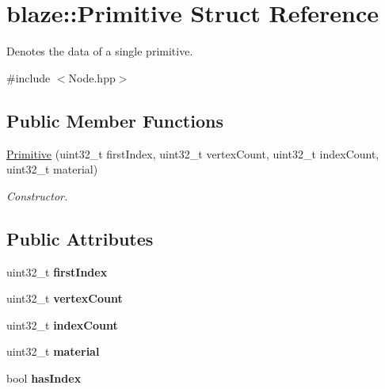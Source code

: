 \hypertarget{structblaze_1_1Primitive}{}\section{blaze\+:\+:Primitive Struct Reference}
\label{structblaze_1_1Primitive}


Denotes the data of a single primitive.  




{\ttfamily \#include $<$Node.\+hpp$>$}

\subsection*{Public Member Functions}
\begin{DoxyCompactItemize}
\item 
\mbox{\label{structblaze_1_1Primitive_ad0b907c09e78d280f97510cfd36b684a}} 
\hyperlink{structblaze_1_1Primitive_ad0b907c09e78d280f97510cfd36b684a}{Primitive} (uint32\+\_\+t first\+Index, uint32\+\_\+t vertex\+Count, uint32\+\_\+t index\+Count, uint32\+\_\+t material)
\begin{DoxyCompactList}\small\item\em Constructor. \end{DoxyCompactList}\end{DoxyCompactItemize}
\subsection*{Public Attributes}
\begin{DoxyCompactItemize}
\item 
\mbox{\label{structblaze_1_1Primitive_a780342ae3a6facb806cf9786c7b884d2}} 
uint32\+\_\+t {\bfseries first\+Index}
\item 
\mbox{\label{structblaze_1_1Primitive_a9b10c1b154e42010399c5dc10b08fc5a}} 
uint32\+\_\+t {\bfseries vertex\+Count}
\item 
\mbox{\label{structblaze_1_1Primitive_a7b85b53fa0c97a37ac71d2f625681644}} 
uint32\+\_\+t {\bfseries index\+Count}
\item 
\mbox{\label{structblaze_1_1Primitive_ad22171261ecd5aeca5007d1f4fea3a8c}} 
uint32\+\_\+t {\bfseries material}
\item 
\mbox{\label{structblaze_1_1Primitive_a5c406e99653f5b6fa3f4a7bee5946133}} 
bool {\bfseries has\+Index}
\end{DoxyCompactItemize}


